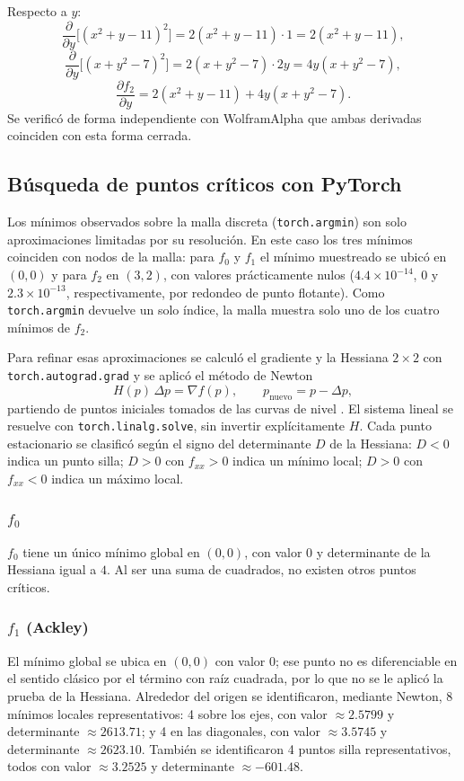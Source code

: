 Respecto a $y$:
\[
\frac{\partial}{\partial y}\big[(x^2+y-11)^2\big] = 2(x^2+y-11)\cdot 1 = 2(x^2+y-11),
\]
\[
\frac{\partial}{\partial y}\big[(x+y^2-7)^2\big] = 2(x+y^2-7)\cdot 2y = 4y(x+y^2-7),
\]
\[
\frac{\partial f_2}{\partial y} = 2(x^2+y-11) + 4y(x+y^2-7).
\]
Se verificó de forma independiente con WolframAlpha que ambas derivadas
coinciden con esta forma cerrada.

\subsection{Búsqueda de puntos críticos con PyTorch}

Los mínimos observados sobre la malla discreta (\texttt{torch.argmin}) son
solo aproximaciones limitadas por su resolución. En este caso los tres
mínimos coinciden con nodos de la malla: para $f_0$ y $f_1$ el mínimo
muestreado se ubicó en $(0,0)$ y para $f_2$ en $(3,2)$, con valores
prácticamente nulos ($4.4\times10^{-14}$, $0$ y $2.3\times10^{-13}$,
respectivamente, por redondeo de punto flotante). Como \texttt{torch.argmin} devuelve un solo índice,
la malla muestra solo uno de los cuatro mínimos de $f_2$.

Para refinar esas aproximaciones se calculó el gradiente y la Hessiana
$2\times2$ con \texttt{torch.autograd.grad} y se aplicó el método de
Newton
\[
H(p)\,\Delta p = \nabla f(p), \qquad p_{\text{nuevo}} = p-\Delta p,
\]
partiendo de puntos iniciales tomados de las curvas de nivel
\cite{nocedal2006numerical}. El sistema lineal se resuelve con
\texttt{torch.linalg.solve}, sin invertir explícitamente $H$. Cada punto
estacionario se clasificó según el signo del determinante $D$ de la
Hessiana: $D<0$ indica un punto silla; $D>0$ con $f_{xx}>0$ indica un
mínimo local; $D>0$ con $f_{xx}<0$ indica un máximo local.

\subsubsection{\texorpdfstring{$f_0$}{f0}}
$f_0$ tiene un único mínimo global en $(0,0)$, con valor $0$ y
determinante de la Hessiana igual a $4$. Al ser una suma de cuadrados, no
existen otros puntos críticos.

\subsubsection{\texorpdfstring{$f_1$}{f1} (Ackley)}
El mínimo global se ubica en $(0,0)$ con valor $0$; ese punto no es
diferenciable en el sentido clásico por el término con raíz cuadrada, por
lo que no se le aplicó la prueba de la Hessiana. Alrededor del origen se
identificaron, mediante Newton, 8 mínimos locales representativos: 4 sobre
los ejes, con valor $\approx 2.5799$ y determinante $\approx 2613.71$; y 4
en las diagonales, con valor $\approx 3.5745$ y determinante $\approx
2623.10$. También se identificaron 4 puntos silla representativos, todos
con valor $\approx 3.2525$ y determinante $\approx -601.48$.

